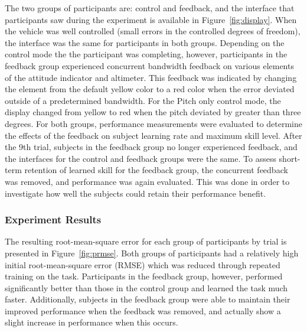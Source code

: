 The two groups of participants are: control and feedback, and the interface that participants saw during the experiment is available in Figure~\ref{fig:display}.
When the vehicle was well controlled (small errors in the controlled degrees of freedom), the interface was the same for participants in both groups.
Depending on the control mode the the participant was completing, however, participants in the feedback group experienced concurrent bandwidth feedback on various elements of the attitude indicator and altimeter.
This feedback was indicated by changing the element from the default yellow color to a red color when the error deviated outside of a predetermined bandwidth.
For the Pitch only control mode, the display changed from yellow to red when the pitch deviated by greater than three degrees.
For both groups, performance measurements were evaluated to determine the effects of the feedback on subject learning rate and maximum skill level.
After the 9th trial, subjects in the feedback group no longer experienced feedback, and the interfaces for the control and feedback groups were the same.
To assess short-term retention of learned skill for the feedback group, the concurrent feedback was removed, and performance was again evaluated.
This was done in order to investigate how well the subjects could retain their performance benefit.

\subsubsection{Experiment Results}
The resulting root-mean-square error for each group of participants by trial is presented in Figure~\ref{fig:prmse}.
Both groups of participants had a relatively high initial root-mean-square error (RMSE) which was reduced through repeated training on the task.
Participants in the feedback group, however, performed significantly better than those in the control group and learned the task much faster.
Additionally, subjects in the feedback group were able to maintain their improved performance when the feedback was removed, and actually show a slight increase in performance when this occurs.

